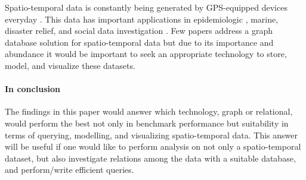 Spatio-temporal data is constantly being generated by GPS-equipped devices everyday \cite{twitterdata}\cite{clost}. This data has important applications in epidemiologic \cite{spatiotemporal-epidemiology}, marine, disaster relief, and social data investigation \cite{rao2012spatiotemporal}. Few papers address a graph database solution for spatio-temporal data but due to its importance and abundance it would be important to seek an appropriate technology to store, model, and visualize these datasets.

\paragraph{In conclusion} The findings in this paper would answer which technology, graph or relational, would perform the best not only in benchmark performance but suitability in terms of querying, modelling, and visualizing spatio-temporal data. This answer will be useful if one would like to perform analysis on not only a spatio-temporal dataset, but also investigate relations among the data with a suitable database, and perform/write efficient queries.